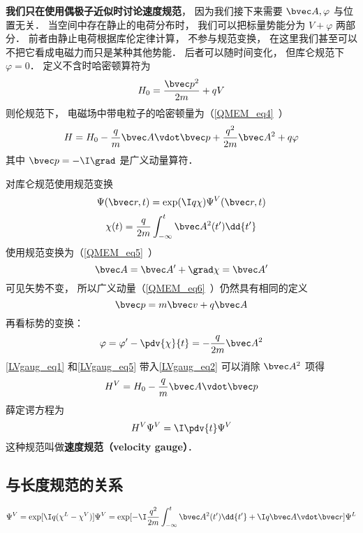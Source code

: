 

\textbf{我们只在使用偶极子近似时讨论速度规范}， 因为我们接下来需要 $\bvec A, \varphi$ 与位置无关． 当空间中存在静止的电荷分布时， 我们可以把标量势能分为 $V + \varphi$ 两部分． 前者由静止电荷根据库伦定律计算， 不参与规范变换， 在这里我们甚至可以不把它看成电磁力而只是某种其他势能． 后者可以随时间变化， 但库仑规范下 $\varphi = 0$． 定义不含时哈密顿算符为
\begin{equation}
H_0 = \frac{\bvec p^2}{2m} + qV
\end{equation}
则伦规范下， 电磁场中带电粒子的哈密顿量为（\autoref{QMEM_eq4}~）
\begin{equation}\label{LVgaug_eq2}
H = H_0 - \frac{q}{m} \bvec A \vdot \bvec p + \frac{q^2}{2m} \bvec A^2 + q\varphi
\end{equation}
其中 $\bvec p = -\I \grad$ 是广义动量算符．

对库仑规范使用规范变换
\begin{equation}\label{LVgaug_eq3}
\Psi(\bvec r, t) = \exp(\I q\chi)\Psi^V(\bvec r, t)
\end{equation}
\begin{equation}\label{LVgaug_eq4}
\chi(t) = \frac{q}{2m} \int_{-\infty}^t \bvec A^2(t') \dd{t'}
\end{equation}
使用规范变换为（\autoref{QMEM_eq5}~）
\begin{equation}\label{LVgaug_eq1}
\bvec A = \bvec A' + \grad \chi = \bvec A'
\end{equation}
可见矢势不变， 所以广义动量（\autoref{QMEM_eq6}~）仍然具有相同的定义
\begin{equation}
\bvec p = m\bvec v + q\bvec A
\end{equation}
再看标势的变换：
\begin{equation}\label{LVgaug_eq5}
\varphi = \varphi' - \pdv{\chi}{t} = - \frac{q}{2m} \bvec A^2
\end{equation}
\autoref{LVgaug_eq1} 和\autoref{LVgaug_eq5} 带入\autoref{LVgaug_eq2} 可以消除 $\bvec A^2$ 项得
\begin{equation}
H^V = H_0 - \frac{q}{m} \bvec A \vdot \bvec p
\end{equation}
薛定谔方程为
\begin{equation}
H^V \Psi^V = \I \pdv{t} \Psi^V
\end{equation}
这种规范叫做\textbf{速度规范（velocity gauge）}．

\subsection{与长度规范的关系}
\begin{equation}
\Psi^V = \exp[\I q(\chi^L - \chi^V)]\Psi^V = \exp[-\I\frac{q^2}{2m}\int_{-\infty}^t \bvec A^2(t')\dd{t'} + \I q \bvec A\vdot \bvec r] \Psi^L
\end{equation}
